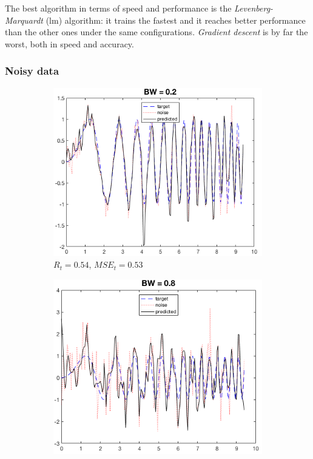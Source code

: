 \documentclass[a4paper, 10pt]{article}
\begin{document}
  The best algorithm
  in terms of speed and performance is the \emph{Levenberg-Marquardt} (lm)
  algorithm: it trains the fastest and it reaches better performance
  than the other ones under the same configurations. \emph{Gradient descent}
  is by far the worst, both in speed and accuracy. %

  \subsubsection{Noisy data}
    \begin{figure}[h]
      \begin{adjustwidth}{-1.1cm}{-1.1cm}
      \centering
      \begin{subfigure}[t]{0.31\linewidth}
        \includegraphics[width=1\linewidth]{./lab1/noise_2e-1.png}
        \caption{$R_t=0.54$, $MSE_t=0.53$}
        \label{fig:noise_small}
      \end{subfigure}
      \begin{subfigure}[t]{0.30\linewidth}
        \includegraphics[width=1\linewidth]{./lab1/noise_8e-1.png}

\end{subfigure}
\end{adjustwidth}
\end{figure}
\end{document}
